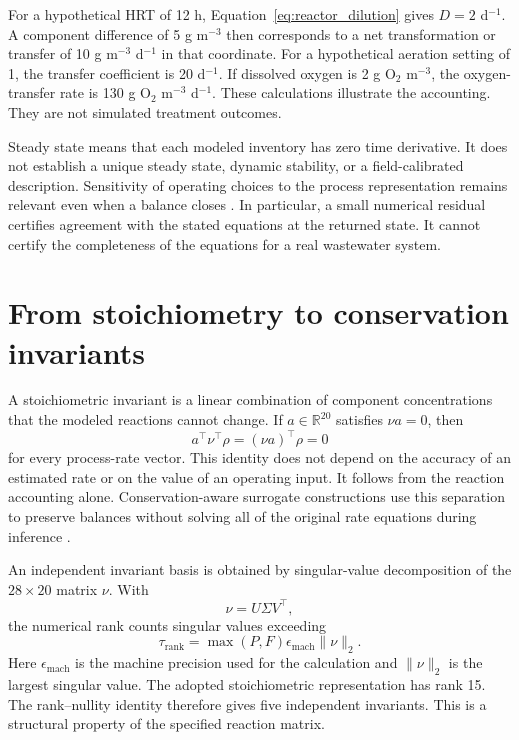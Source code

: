 For a hypothetical HRT of 12 h, Equation~\eqref{eq:reactor_dilution} gives $D=2$ d$^{-1}$. A component difference of 5 g m$^{-3}$ then corresponds to a net transformation or transfer of 10 g m$^{-3}$ d$^{-1}$ in that coordinate. For a hypothetical aeration setting of 1, the transfer coefficient is 20 d$^{-1}$. If dissolved oxygen is 2 g O$_2$ m$^{-3}$, the oxygen-transfer rate is 130 g O$_2$ m$^{-3}$ d$^{-1}$. These calculations illustrate the accounting. They are not simulated treatment outcomes.

Steady state means that each modeled inventory has zero time derivative. It does not establish a unique steady state, dynamic stability, or a field-calibrated description. Sensitivity of operating choices to the process representation remains relevant even when a balance closes \citep{Araujo2013}. In particular, a small numerical residual certifies agreement with the stated equations at the returned state. It cannot certify the completeness of the equations for a real wastewater system.

\section{From stoichiometry to conservation invariants}

A stoichiometric invariant is a linear combination of component concentrations that the modeled reactions cannot change. If $a\in\mathbb{R}^{20}$ satisfies $\nu a=0$, then
\begin{equation}
a^\top\nu^\top\rho=(\nu a)^\top\rho=0
\label{eq:individual_invariant}
\end{equation}
for every process-rate vector. This identity does not depend on the accuracy of an estimated rate or on the value of an operating input. It follows from the reaction accounting alone. Conservation-aware surrogate constructions use this separation to preserve balances without solving all of the original rate equations during inference \citep{SturmWexler2020,SturmWexler2022,Hansen2024}.

An independent invariant basis is obtained by singular-value decomposition of the $28\times20$ matrix $\nu$. With
\begin{equation}
\nu=U\Sigma V^\top,
\label{eq:stoichiometric_svd}
\end{equation}
the numerical rank counts singular values exceeding
\begin{equation}
\tau_{\mathrm{rank}}=\max(P,F)\epsilon_{\mathrm{mach}}\|\nu\|_2.
\label{eq:stoichiometric_rank_threshold}
\end{equation}
Here $\epsilon_{\mathrm{mach}}$ is the machine precision used for the calculation and $\|\nu\|_2$ is the largest singular value. The adopted stoichiometric representation has rank 15. The rank--nullity identity therefore gives five independent invariants. This is a structural property of the specified reaction matrix.

